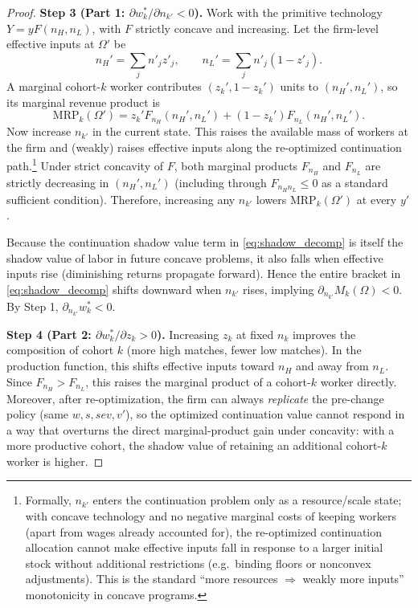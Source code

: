 \begin{proof}
\medskip
\noindent\textbf{Step 3 (Part 1: $\partial w_k^*/\partial n_{k'}<0$).}
Work with the primitive technology $Y=yF(n_H,n_L)$, with $F$ strictly concave and increasing.
Let the firm-level effective inputs at $\Omega'$ be
\[
n_H'=\sum_j n'_j z'_j,\qquad n_L'=\sum_j n'_j(1-z'_j).
\]
A marginal cohort-$k$ worker contributes $(z_k',1-z_k')$ units to $(n_H',n_L')$, so its marginal revenue product is
\[
\text{MRP}_k(\Omega') = z_k' F_{n_H}(n_H',n_L')+(1-z_k')F_{n_L}(n_H',n_L').
\]
Now increase $n_{k'}$ in the current state. This raises the available mass of workers at the firm and (weakly) raises effective inputs
along the re-optimized continuation path.\footnote{Formally, $n_{k'}$ enters the continuation problem only as a resource/scale
state; with concave technology and no negative marginal costs of keeping workers (apart from wages already accounted for),
the re-optimized continuation allocation cannot make effective inputs fall in response to a larger initial stock without additional
restrictions (e.g.\ binding floors or nonconvex adjustments). This is the standard ``more resources $\Rightarrow$ weakly more inputs''
monotonicity in concave programs.}
Under strict concavity of $F$, both marginal products $F_{n_H}$ and $F_{n_L}$ are strictly decreasing in $(n_H',n_L')$
(including through $F_{n_H n_L}\le 0$ as a standard sufficient condition).
Therefore, increasing any $n_{k'}$ lowers $\text{MRP}_k(\Omega')$ at every $y'$.

Because the continuation shadow value term in \eqref{eq:shadow_decomp} is itself the shadow value of labor in future concave problems,
it also falls when effective inputs rise (diminishing returns propagate forward).
Hence the entire bracket in \eqref{eq:shadow_decomp} shifts downward when $n_{k'}$ rises, implying
$\partial_{n_{k'}} M_k(\Omega)<0$. By Step 1,
$\partial_{n_{k'}} w_k^*<0$.

\medskip
\noindent\textbf{Step 4 (Part 2: $\partial w_k^*/\partial z_k>0$).}
Increasing $z_k$ at fixed $n_k$ improves the composition of cohort $k$ (more high matches, fewer low matches).
In the production function, this shifts effective inputs toward $n_H$ and away from $n_L$.
Since $F_{n_H}>F_{n_L}$, this raises the marginal product of a cohort-$k$ worker directly.
Moreover, after re-optimization, the firm can always \emph{replicate} the pre-change policy (same $w,s,sev,v'$),
so the optimized continuation value cannot respond in a way that overturns the direct marginal-product gain under concavity:
with a more productive cohort, the shadow value of retaining an additional cohort-$k$ worker is higher.


\end{proof}
